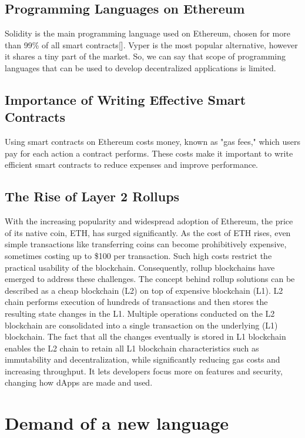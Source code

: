 \subsection{Programming Languages on Ethereum}
Solidity is the main programming language used on Ethereum, chosen for more than 99\% of all smart contracts[]. Vyper is the most popular alternative, however it shares a tiny part of the market. So, we can say that scope of programming languages that can be used to develop decentralized applications is limited.

\subsection{Importance of Writing Effective Smart Contracts}
Using smart contracts on Ethereum costs money, known as "gas fees," which users pay for each action a contract performs. These costs make it important to write efficient smart contracts to reduce expenses and improve performance.

\subsection{The Rise of Layer 2 Rollups}
With the increasing popularity and widespread adoption of Ethereum, the price of its native coin, ETH, has surged significantly. As the cost of ETH rises, even simple transactions like transferring coins can become prohibitively expensive, sometimes costing up to \$100 per transaction. Such high costs restrict the practical usability of the blockchain. Consequently, rollup blockchains have emerged to address these challenges. The concept behind rollup solutions can be described as a cheap blockchain (L2) on top of expensive blockchain (L1). L2 chain performs execution of hundreds of transactions and then stores the resulting state changes in the L1. Multiple operations conducted on the L2 blockchain are consolidated into a single transaction on the underlying (L1) blockchain. The fact that all the changes eventually is stored in L1 blockchain enables the L2 chain to retain all L1 blockchain characteristics such as immutability and decentralization, while significantly reducing gas costs and increasing throughput. It lets developers focus more on features and security, changing how dApps are made and used.


\section{Demand of a new language}

